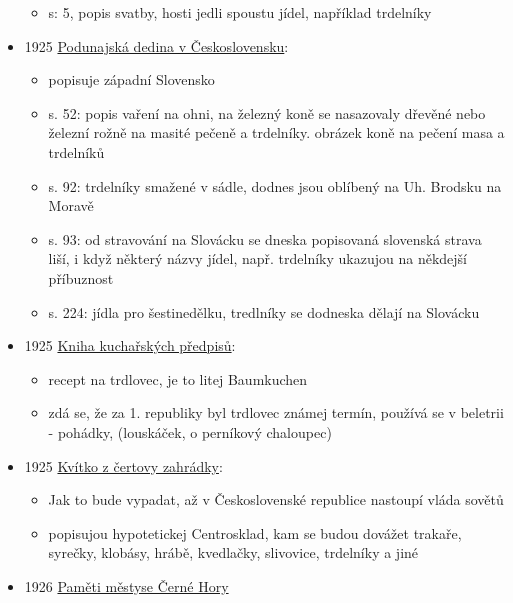 \begin{itemize}
  \begin{itemize}
  \tightlist
  \item
    s: 5, popis svatby, hosti jedli spoustu jídel, například trdelníky
  \end{itemize}
\item
  1925
  \href{https://www.digitalniknihovna.cz/nulk/uuid/uuid:b2d75327-ce5f-4248-8ec5-52b0f9b2f9af}{Podunajská
  dedina v Československu}:

  \begin{itemize}
  \tightlist
  \item
    popisuje západní Slovensko
  \item
    s. 52: popis vaření na ohni, na železný koně se nasazovaly dřevěné
    nebo železní rožně na masité pečeně a trdelníky. obrázek koně na
    pečení masa a trdelníků
  \item
    s. 92: trdelníky smažené v sádle, dodnes jsou oblíbený na Uh.
    Brodsku na Moravě
  \item
    s. 93: od stravování na Slovácku se dneska popisovaná slovenská
    strava liší, i když některý názvy jídel, např. trdelníky ukazujou na
    někdejší příbuznost
  \item
    s. 224: jídla pro šestinedělku, tredlníky se dodneska dělají na
    Slovácku
  \end{itemize}
\item
  1925
  \href{https://ceskadigitalniknihovna.cz/view/uuid:fc3b3470-0163-11ea-af21-005056827e52?page=uuid\%3Aeb966593-da2e-4197-8137-77bb9b40d4c7&fulltext=trdlovec&source=nkp}{Kniha
  kuchařských předpisů}:

  \begin{itemize}
  \tightlist
  \item
    recept na trdlovec, je to litej Baumkuchen
  \item
    zdá se, že za 1. republiky byl trdlovec známej termín, používá se v
    beletrii - pohádky, (louskáček, o perníkový chaloupec)
  \end{itemize}
\item
  1925
  \href{https://ceskadigitalniknihovna.cz/uuid/uuid:f9d7dc50-c0ec-4cbb-ace5-c60d24598488}{Kvítko
  z čertovy zahrádky}:

  \begin{itemize}
  \tightlist
  \item
    Jak to bude vypadat, až v Československé republice nastoupí vláda
    sovětů
  \item
    popisujou hypotetickej Centrosklad, kam se budou dovážet trakaře,
    syrečky, klobásy, hrábě, kvedlačky, slivovice, trdelníky a jiné
  \end{itemize}
\item
  1926
  \href{https://ndk.cz/view/uuid:be635380-b1b9-11ed-826c-005056827e52?page=uuid\%3A9ae6ef00-82cb-438b-8727-ef820bed7a49}{Paměti
  městyse Černé Hory}


\end{itemize}
